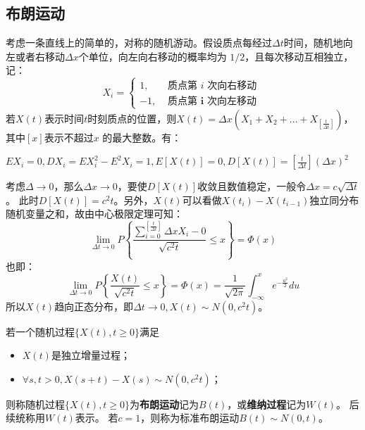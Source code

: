 \subsection{布朗运动}
考虑一条直线上的简单的，对称的随机游动。假设质点每经过$\Delta t$时间，随机地向左或者右移动$\Delta x$个单位，向左向右移动的概率均为
$1/2$，且每次移动互相独立，记：
\begin{equation}
  X_i= \begin{cases}1, & \text { 质点第 } i \text { 次向右移动 } \\ -1, & \text { 质点第 } \boldsymbol{i} \text { 次向左移动 }\end{cases}
\end{equation}
若$X(t)$表示时间$t$时刻质点的位置，则$X(t)=\Delta x(X_1 + X_2 + \dots + X_{[\frac{t}{\Delta t}]})$，其中$[x]$表示不超过$x$
的最大整数。有：

$EX_i = 0, DX_i = EX^2_i - E^2X_i = 1, E[X(t)]=0, D[X(t)]=[\frac{t}{\Delta t}](\Delta x)^2$

考虑$\Delta \rightarrow 0$，那么$\Delta x \rightarrow 0$，要使$D[X(t)]$收敛且数值稳定，一般令$\Delta x=c\sqrt{\Delta t}$。
此时$D[X(t)]=c^2t$。另外，$X(t)$可以看做$X(t_i) - X(t_{i-1})$独立同分布随机变量之和，故由中心极限定理可知：
\begin{equation}
  \lim _{\Delta t \rightarrow 0} P\left\{\frac{\sum_{i=0}^{\left[\frac{t}{\Delta t}\right]} \Delta x X_i-0}{\sqrt{c^2 t}} \leq x\right\}=\Phi(x)
\end{equation}
也即：
\begin{equation}
  \lim _{\Delta t \rightarrow 0} P\left\{\frac{X(t)}{\sqrt{c^2 t}} \leq x\right\}=\Phi(x)=\frac{1}{\sqrt{2 \pi}} \int_{-\infty}^x e^{-\frac{u^2}{2}} d u
\end{equation}
所以$X(t)$趋向正态分布，即$\Delta t \rightarrow 0, X(t) \sim N(0, c^2t)$。

\begin{definition}
  若一个随机过程$\{X(t), t \geq 0 \}$满足
  \begin{itemize}
    \item[1.] $X(t)$是独立增量过程；
    \item[2.] $\forall s, t>0, X(s+t)-X(s) \sim N\left(0, c^2 t\right)$；
  \end{itemize}
  则称随机过程$\{X(t), t \geq 0 \}$为\textbf{布朗运动}记为$B(t)$，或\textbf{维纳过程}记为$W(t)$。
  后续统称用$W(t)$表示。
  若$c=1$，则称为标准布朗运动$B(t)\sim N(0, t)$。



\end{definition}

